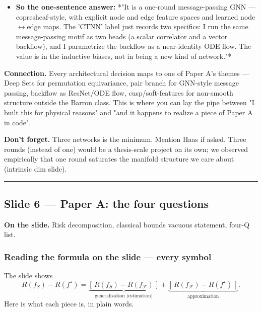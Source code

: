 \documentclass[11pt]{article}
\begin{document}
\begin{itemize}
\begin{enumerate}
piece that keeps $\|\Delta x\|/\ell \lesssim 0.1$.
\item \emph{Physics-conditioned messages.} Spin-weighted edges
$w^{\rm spin}_{ij}$, soft-core safe radial features, rotation-
equivariant vector messages, zero-mean displacement (centre-of-mass
conservation). A textbook GNN would not bake in any of these.
\end{enumerate}
\item \textbf{So the one-sentence answer:} *"It is a one-round message-passing GNN ---
copresheaf-style, with explicit node and edge feature spaces and learned
node$\leftrightarrow$edge maps. The 'CTNN' label just records two
specifics: I run the same message-passing motif as two heads (a scalar
correlator and a vector backflow), and I parametrize the backflow as a
near-identity ODE flow. The value is in the inductive biases, not in
being a new kind of network."*
\end{itemize}
\textbf{Connection.} Every architectural decision maps to one of Paper A's
themes --- Deep Sets for permutation equivariance, pair branch for GNN-style
message passing, backflow as ResNet/ODE flow, cusp/soft-features for
non-smooth structure outside the Barron class. This is where you can lay
the pipe between "I built this for physical reasons" and "and it happens to
realize a piece of Paper A in code".

\textbf{Don't forget.} Three networks is the minimum. Mention Haas if asked.
Three rounds (instead of one) would be a thesis-scale project on its own;
we observed empirically that one round saturates the manifold structure we
care about (intrinsic dim slide).

\vspace{4pt}\hrule\vspace{8pt}

\subsection*{Slide 6 --- Paper A: the four questions}

\textbf{On the slide.} Risk decomposition, classical bounds vacuous statement,
four-Q list.

\subsubsection*{Reading the formula on the slide --- every symbol}

The slide shows
\[R(f_S) - R(f^\star) = \underbrace{[\,R(f_S) - R(f_{\mathcal F})\,]}
   _{\text{generalization (estimation)}}
   + \underbrace{[\,R(f_{\mathcal F}) - R(f^\star)\,]}_{\text{approximation}}.\]
Here is what each piece is, in plain words.
\end{document}

